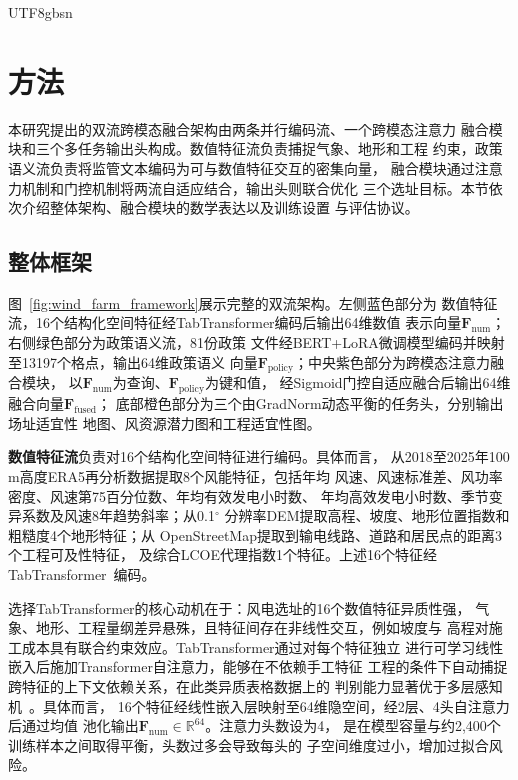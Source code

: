\documentclass[12pt, a4paper]{article}
\begin{document}
\begin{CJK}{UTF8}{gbsn}
\section{方法}

本研究提出的双流跨模态融合架构由两条并行编码流、一个跨模态注意力
融合模块和三个多任务输出头构成。数值特征流负责捕捉气象、地形和工程
约束，政策语义流负责将监管文本编码为可与数值特征交互的密集向量，
融合模块通过注意力机制和门控机制将两流自适应结合，输出头则联合优化
三个选址目标。本节依次介绍整体架构、融合模块的数学表达以及训练设置
与评估协议。

\subsection{整体框架}

图~\ref{fig:wind_farm_framework}展示完整的双流架构。左侧蓝色部分为
数值特征流，16个结构化空间特征经TabTransformer编码后输出64维数值
表示向量$\mathbf{F}_\text{num}$；右侧绿色部分为政策语义流，81份政策
文件经BERT+LoRA微调模型编码并映射至13197个格点，输出64维政策语义
向量$\mathbf{F}_\text{policy}$；中央紫色部分为跨模态注意力融合模块，
以$\mathbf{F}_\text{num}$为查询、$\mathbf{F}_\text{policy}$为键和值，
经Sigmoid门控自适应融合后输出64维融合向量$\mathbf{F}_\text{fused}$；
底部橙色部分为三个由GradNorm动态平衡的任务头，分别输出场址适宜性
地图、风资源潜力图和工程适宜性图。

\textbf{数值特征流}负责对16个结构化空间特征进行编码。具体而言，
从2018至2025年100\,m高度ERA5再分析数据提取8个风能特征，包括年均
风速、风速标准差、风功率密度、风速第75百分位数、年均有效发电小时数、
年均高效发电小时数、季节变异系数及风速8年趋势斜率；从0.1$^\circ$
分辨率DEM提取高程、坡度、地形位置指数和粗糙度4个地形特征；从
OpenStreetMap提取到输电线路、道路和居民点的距离3个工程可及性特征，
及综合LCOE代理指数1个特征。上述16个特征经
TabTransformer~\cite{huang2020tabtransformer}编码。

选择TabTransformer的核心动机在于：风电选址的16个数值特征异质性强，
气象、地形、工程量纲差异悬殊，且特征间存在非线性交互，例如坡度与
高程对施工成本具有联合约束效应。TabTransformer通过对每个特征独立
进行可学习线性嵌入后施加Transformer自注意力，能够在不依赖手工特征
工程的条件下自动捕捉跨特征的上下文依赖关系，在此类异质表格数据上的
判别能力显著优于多层感知机~\cite{huang2020tabtransformer}。具体而言，
16个特征经线性嵌入层映射至64维隐空间，经2层、4头自注意力后通过均值
池化输出$\mathbf{F}_\text{num} \in \mathbb{R}^{64}$。注意力头数设为4，
是在模型容量与约2,400个训练样本之间取得平衡，头数过多会导致每头的
子空间维度过小，增加过拟合风险。


\end{CJK}
\end{document}
